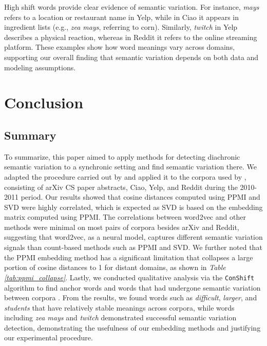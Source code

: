 \documentclass[11pt]{article}
\begin{document}
High shift words provide clear evidence of semantic variation. For instance, \textit{mays} refers to a location or restaurant name in Yelp, while in Ciao it appears in ingredient lists (e.g., \textit{zea mays}, referring to corn). Similarly, \textit{twitch} in Yelp describes a physical reaction, whereas in Reddit it refers to the online streaming platform. These examples show how word meanings vary across domains, supporting our overall finding that semantic variation depends on both data and modeling assumptions.

\section{Conclusion}

\subsection{Summary}

To summarize, this paper aimed to apply methods for detecting diachronic semantic variation to a synchronic setting and find semantic variation there. We adapted the procedure carried out by \citet{hamilton2016diachronic} and applied it to the corpora used by \citet{hofmann2021dcwe}, consisting of arXiv CS paper abstracts, Ciao, Yelp, and Reddit during the 2010-2011 period. Our results showed that cosine distances computed using PPMI and SVD were highly correlated, which is expected as SVD is based on the embedding matrix computed using PPMI. The correlations between word2vec and other methods were minimal on most pairs of corpora besides arXiv and Reddit, suggesting that word2vec, as a neural model, captures different semantic variation signals than count-based methods such as PPMI and SVD. We further noted that the PPMI embedding method has a significant limitation that collapses a large portion of cosine distances to 1 for distant domains, as shown in \textit{Table \ref{tab:ppmi_collapse}}. Lastly, we conducted qualitative analysis via the \texttt{ConShift} algorithm to find anchor words and words that had undergone semantic variation between corpora \cite{arrington2025conshift}. From the results, we found words such as \textit{difficult}, \textit{larger}, and \textit{students} that have relatively stable meanings across corpora, while words including \textit{zea mays} and \textit{twitch} demonstrated successful semantic variation detection, demonstrating the usefulness of our embedding methods and justifying our experimental procedure.
\end{document}
